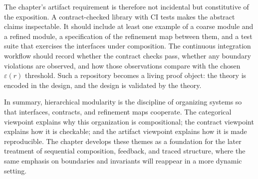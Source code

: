 \documentclass[11pt]{article}
\begin{document}
The chapter’s artifact requirement is therefore not incidental but constitutive of the exposition. A contract-checked library with CI tests makes the abstract claims inspectable. It should include at least one example of a coarse module and a refined module, a specification of the refinement map between them, and a test suite that exercises the interfaces under composition. The continuous integration workflow should record whether the contract checks pass, whether any boundary violations are observed, and how those observations compare with the chosen \(\varepsilon(r)\) threshold. Such a repository becomes a living proof object: the theory is encoded in the design, and the design is validated by the theory.

In summary, hierarchical modularity is the discipline of organizing systems so that interfaces, contracts, and refinement maps cooperate. The categorical viewpoint explains why this organization is compositional; the contract viewpoint explains how it is checkable; and the artifact viewpoint explains how it is made reproducible. The chapter develops these themes as a foundation for the later treatment of sequential composition, feedback, and traced structure, where the same emphasis on boundaries and invariants will reappear in a more dynamic setting.
\end{document}
